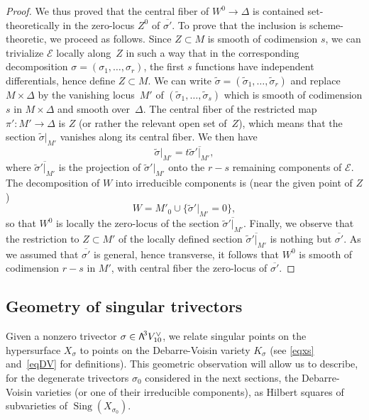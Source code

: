 \documentclass[11pt]{article}
\let\mathcal\mathscr
\theoremstyle{definition}
\newcommand\cE{\mathcal{E}}
\DeclareMathOperator{\Sing}{Sing}\let\sing\Sing
\newcommand\bw[1]{{\hbox{\large$\mathsf{\Lambda}$}^{\!#1}}}
\begin{document}
\begin{proof}
We thus proved that
the central fiber of $W^0\to \Delta$ is contained set-theoretically in the zero-locus $Z^0$ of $\overline {\sigma'} $. To prove that the inclusion is scheme-theoretic, we proceed as follows.
Since $Z\subset M$ is smooth of codimension $s$, we can trivialize $\cE$ locally along~$Z$ in such a way
that in the corresponding decomposition $\sigma=(\sigma_1,\ldots,\sigma_r)$, the first $s$ functions have independent differentials, hence define $Z\subset M$. We can write
$\widetilde\sigma=(\widetilde\sigma_1,\ldots,\widetilde\sigma_r)$ and replace $M\times \Delta$ by the vanishing locus~$M'$ of
$(\widetilde\sigma_1,\ldots,\widetilde\sigma_s)$ which is smooth of codimension $s$ in $M\times \Delta$ and smooth
over~$\Delta$. The central fiber of the restricted map $\pi'\colon M'\to \Delta$ is $Z$ (or rather the relevant open set of~$Z$),
which means that the section $\widetilde\sigma\vert_{ M'}$ vanishes along its central fiber. We then have
\begin{equation}\label{eqpourMprime}
\widetilde\sigma\vert_{ M'}=t\overline{\widetilde\sigma'\vert_{ M'}},
\end{equation}
where $\overline{\widetilde\sigma'\vert_{ M'}}$ is the projection of $\widetilde\sigma'\vert_{ M'}$ onto the
$r-s$ remaining components of $\cE$.
The decomposition of $W$ into irreducible components is (near the given point of $Z$)
\[
W=M'_0\cup \{\widetilde\sigma'\vert_{ M'}=0\},
\]
so that $W^0$ is locally the zero-locus of the section $\overline{\widetilde\sigma'\vert_{ M'}}$. Finally, we observe that the restriction to $Z\subset M'$ of the locally defined section
$\overline{\widetilde\sigma'\vert_{ M'}}$ is nothing but $\overline { \sigma'} $. As we assumed that
$\overline { \sigma'} $ is general, hence transverse, it follows that
$W^0$ is smooth of codimension $r-s$ in $M'$, with central fiber the zero-locus of $\overline { \sigma'} $.
\end{proof}

\subsection{Geometry of singular trivectors}

Given a nonzero trivector $\sigma\in \bw3V_{10}^\vee$, we relate singular points on the hypersurface $X_\sigma$ to points on the Debarre-Voisin variety $K_\sigma$ (see \eqref{eqxs} and~\eqref{eqDV} for definitions). This geometric observation will allow us to describe, for the degenerate trivectors $\sigma_0$ considered in the next sections, the Debarre-Voisin varieties
(or one of their irreducible components), as
Hilbert squares of subvarieties of $\Sing(X_{\sigma_0})$.
\end{document}
